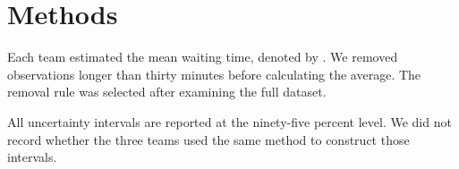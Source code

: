 \section{Methods}

Each team estimated the mean waiting time, denoted by \waitmean. We removed observations longer than thirty minutes before calculating the average. The removal rule was selected after examining the full dataset.

All uncertainty intervals are reported at the ninety-five percent level. We did not record whether the three teams used the same method to construct those intervals.
